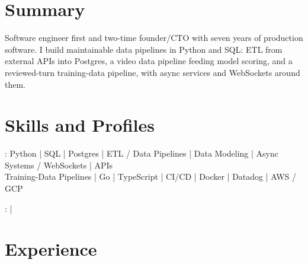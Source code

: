 \documentclass[print]{jack-resume}
\begin{document}
\pagecolor{darkmodeBackground}


\begin{minipage}[t][1cm][t]{.03\textwidth}
    \hfill
\end{minipage}

\section{Summary}
Software engineer first and two-time founder/CTO with seven years of production software. I build maintainable data pipelines in Python and SQL: ETL from external APIs into Postgres, a video data pipeline feeding model scoring, and a reviewed-turn training-data pipeline, with async services and WebSockets around them.
\sectionsep

\section{Skills and Profiles}
:
Python \hfill | \hfill
SQL \hfill | \hfill
Postgres \hfill | \hfill
ETL / Data Pipelines \hfill | \hfill
Data Modeling \hfill | \hfill
Async Systems / WebSockets \hfill | \hfill
APIs \\
\hspace{1.0cm} Training-Data Pipelines \hfill | \hfill
Go \hfill | \hfill
TypeScript \hfill | \hfill
CI/CD \hfill | \hfill
Docker \hfill | \hfill
Datadog \hfill | \hfill
AWS / GCP \\

\raggedright{
    :
      \href{https://www.linkedin.com/in/jack-sturtevant/}{ \ExternalLink} |
     \href{https://github.com/jacksturt}{ \ExternalLink}}

\section{Experience}
\end{document}
